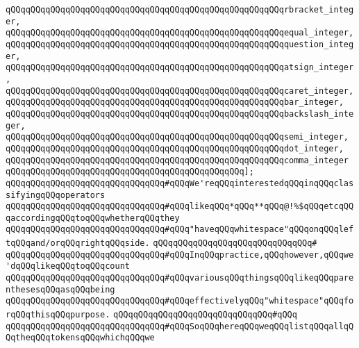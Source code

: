\verb|qQQqqQQqqQQqqQQqqQQqqQQqqQQqqQQqqQQqqQQqqQQqqQQqqQQqqQQqrbracket_integer,|\newline
\verb|qQQqqQQqqQQqqQQqqQQqqQQqqQQqqQQqqQQqqQQqqQQqqQQqqQQqqQQqequal_integer,|\newline
\verb|qQQqqQQqqQQqqQQqqQQqqQQqqQQqqQQqqQQqqQQqqQQqqQQqqQQqqQQqquestion_integer,|\newline
\verb|qQQqqQQqqQQqqQQqqQQqqQQqqQQqqQQqqQQqqQQqqQQqqQQqqQQqqQQqatsign_integer,|\newline
\verb|qQQqqQQqqQQqqQQqqQQqqQQqqQQqqQQqqQQqqQQqqQQqqQQqqQQqqQQqcaret_integer,|\newline
\verb|qQQqqQQqqQQqqQQqqQQqqQQqqQQqqQQqqQQqqQQqqQQqqQQqqQQqqQQqbar_integer,|\newline
\verb|qQQqqQQqqQQqqQQqqQQqqQQqqQQqqQQqqQQqqQQqqQQqqQQqqQQqqQQqbackslash_integer,|\newline
\verb|qQQqqQQqqQQqqQQqqQQqqQQqqQQqqQQqqQQqqQQqqQQqqQQqqQQqqQQqsemi_integer,|\newline
\verb|qQQqqQQqqQQqqQQqqQQqqQQqqQQqqQQqqQQqqQQqqQQqqQQqqQQqqQQqdot_integer,|\newline
\verb|qQQqqQQqqQQqqQQqqQQqqQQqqQQqqQQqqQQqqQQqqQQqqQQqqQQqqQQqcomma_integer|\newline
\verb|qQQqqQQqqQQqqQQqqQQqqQQqqQQqqQQqqQQqqQQqqQQqqQQq];|\newline
\newline
\verb|qQQqqQQqqQQqqQQqqQQqqQQqqQQqqQQq#qQQqWe'reqQQqinterestedqQQqinqQQqclassifyingqQQqoperators|\newline
\verb|qQQqqQQqqQQqqQQqqQQqqQQqqQQqqQQq#qQQqlikeqQQq*qQQq**qQQq@!%$qQQqetcqQQqaccordingqQQqtoqQQqwhetherqQQqthey|\newline
\verb|qQQqqQQqqQQqqQQqqQQqqQQqqQQqqQQq#qQQq"haveqQQqwhitespace"qQQqonqQQqleftqQQqand/orqQQqrightqQQqside.|\newline
\verb|qQQqqQQqqQQqqQQqqQQqqQQqqQQqqQQq#|\newline
\verb|qQQqqQQqqQQqqQQqqQQqqQQqqQQqqQQq#qQQqInqQQqpractice,qQQqhowever,qQQqwe'dqQQqlikeqQQqtoqQQqcount|\newline
\verb|qQQqqQQqqQQqqQQqqQQqqQQqqQQqqQQq#qQQqvariousqQQqthingsqQQqlikeqQQqparenthesesqQQqasqQQqbeing|\newline
\verb|qQQqqQQqqQQqqQQqqQQqqQQqqQQqqQQq#qQQqeffectivelyqQQq"whitespace"qQQqforqQQqthisqQQqpurpose.|\newline
\verb|qQQqqQQqqQQqqQQqqQQqqQQqqQQqqQQq#qQQq|\newline
\verb|qQQqqQQqqQQqqQQqqQQqqQQqqQQqqQQq#qQQqSoqQQqhereqQQqweqQQqlistqQQqallqQQqtheqQQqtokensqQQqwhichqQQqwe|\newline
